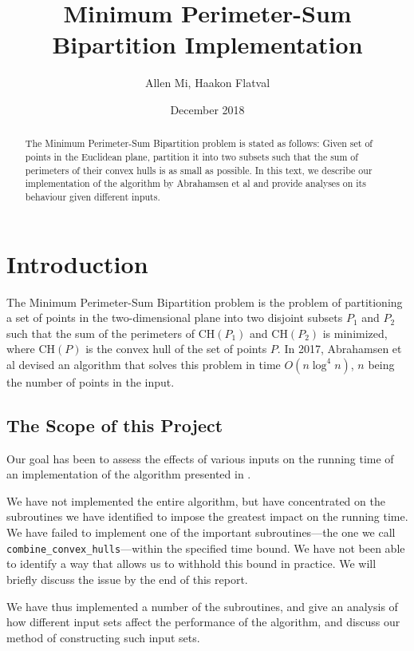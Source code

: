 \documentclass{article}
\title{Minimum Perimeter-Sum Bipartition Implementation}
\author{Allen Mi, Haakon Flatval}
\date{December 2018}
\begin{document}
\maketitle

\begin{abstract}
    The Minimum Perimeter-Sum Bipartition problem is stated as follows: Given set of points in the Euclidean plane, partition it into two subsets such that the sum of perimeters of their convex hulls is as small as possible. In this text, we describe our implementation of the algorithm by Abrahamsen et al \cite{abb17} and provide analyses on its behaviour given different inputs.
\end{abstract}

\section{Introduction}
The Minimum Perimeter-Sum Bipartition problem is the problem of partitioning a set of points in the two-dimensional plane into two disjoint subsets $P_1$ and $P_2$ such that the sum of the perimeters of $\text{CH}(P_1)$ and $\text{CH}(P_2)$ is minimized, where $\text{CH}(P)$ is the convex hull of the set of points $P$. In 2017, Abrahamsen et al \cite{abb17} devised an algorithm that solves this problem in time $O(n \log^4 n)$, $n$ being the number of points in the input. 

\subsection{The Scope of this Project}

Our goal has been to assess the effects of various inputs on the running time of an implementation of the algorithm presented in \cite{abb17}. 

We have not implemented the entire algorithm, but have concentrated on the subroutines we have identified to impose the greatest impact on the running time. 
We have failed to implement one of the important subroutines---the one we call \texttt{combine\_convex\_hulls}---within the specified time bound. We have not been able to identify a way that allows us to withhold this bound in practice. We will briefly discuss the issue by the end of this report.

We have thus implemented a number of the subroutines, and give an analysis of how different input sets affect the performance of the algorithm, and discuss our method of constructing such input sets.
\end{document}
